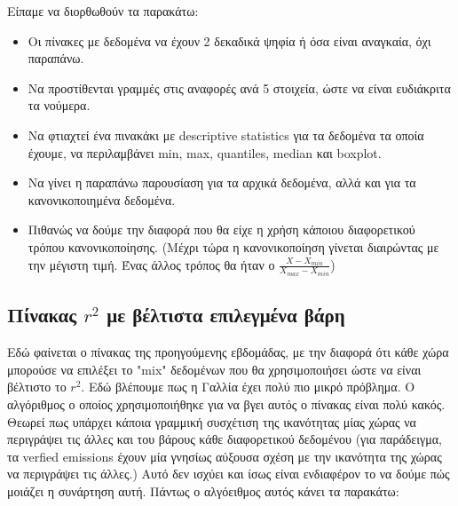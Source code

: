 \documentclass[a4paper,twoside,10pt]{article}
\begin{document}
	Είπαμε να διορθωθούν τα παρακάτω:
	\begin{itemize}
		\item Οι πίνακες με δεδομένα να έχουν 2 δεκαδικά ψηφία ή όσα είναι αναγκαία, όχι παραπάνω.
		\item Να προστίθενται γραμμές στις αναφορές ανά 5 στοιχεία, ώστε να είναι ευδιάκριτα τα νούμερα.
		\item Να φτιαχτεί ένα πινακάκι με descriptive statistics για τα δεδομένα τα οποία έχουμε, να περιλαμβάνει min, max, quantiles, median και boxplot.
		\item Να γίνει η παραπάνω παρουσίαση για τα αρχικά δεδομένα, αλλά και για τα κανονικοποιημένα δεδομένα.
		\item Πιθανώς να δούμε την διαφορά που θα είχε η χρήση κάποιου διαφορετικού τρόπου κανονικοποίησης. (Μέχρι τώρα η κανονικοποίηση γίνεται διαιρώντας με την μέγιστη τιμή. Ένας άλλος τρόπος θα ήταν ο $\frac{X- X_{min}}{X_{max}- X_{min}}$)
	\end{itemize}
	
	
	\subsection{Πίνακας $r^2$ με βέλτιστα επιλεγμένα βάρη}
	Εδώ φαίνεται ο πίνακας της προηγούμενης εβδομάδας, με την διαφορά ότι κάθε χώρα μπορούσε να επιλέξει το "mix" δεδομένων που θα χρησιμοποιήσει ώστε να είναι βέλτιστο το $r^2$. Εδώ βλέπουμε πως η Γαλλία έχει  πολύ πιο μικρό πρόβλημα. 
	Ο αλγόριθμος ο οποίος χρησιμοποιήθηκε για να βγει αυτός ο πίνακας είναι πολύ κακός. Θεωρεί πως υπάρχει κάποια γραμμική συσχέτιση της ικανότητας μίας χώρας να περιγράψει τις άλλες και του βάρους κάθε διαφορετικού δεδομένου (για παράδειγμα, τα verfied emissions έχουν μία γνησίως αύξουσα σχέση με την ικανότητα της χώρας να περιγράψει τις άλλες.) Αυτό δεν ισχύει και ίσως είναι ενδιαφέρον το να δούμε πώς μοιάζει η συνάρτηση αυτή. Πάντως ο αλγόειθμος αυτός κάνει τα παρακάτω:
	
\end{document}
